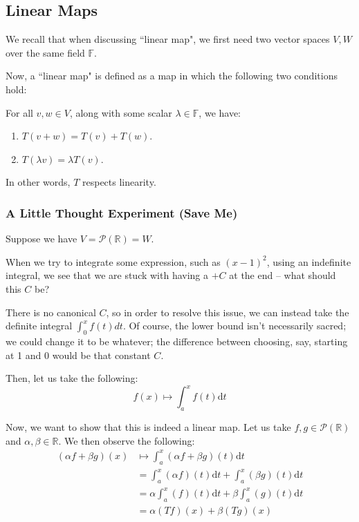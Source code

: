 \documentclass[openany]{book}
\newcommand{\RR}{\mathbb{R}}
\begin{document}
\subsection{Linear Maps}
We recall that when discussing ``linear map", we first need two vector spaces $V, W$ over the same field $\mathbb{F}$. 

Now, a ``linear map" is defined as a map in which the following two conditions hold:

For all $v, w \in V$, along with some scalar $\lambda \in \mathbb{F}$, we have:
\begin{enumerate}
	\item $T(v+w) = T(v) + T(w)$.
	\item $T(\lambda v) = \lambda T(v)$.
\end{enumerate}

In other words, $T$ respects linearity.

\subsubsection{A Little Thought Experiment (Save Me)}
Suppose we have $V = \mathscr{P}(\RR) = W$.

When we try to integrate some expression, such as $(x-1)^{2}$, using an indefinite integral, we see that we are stuck with having a $+C$ at the end -- what should this $C$ be?

There is no canonical $C$, so in order to resolve this issue, we can instead take the definite integral $\int_{0}^{x} f(t) dt$. Of course, the lower bound isn't necessarily sacred; we could change it to be whatever; the difference between choosing, say, starting at 1 and 0 would be that constant $C$.

Then, let us take the following:
\begin{equation*}
	f(x) \mapsto \int_{a}^{x} f(t) \mathrm d t
\end{equation*}

Now, we want to show that this is indeed a linear map. Let us take $f,g \in \mathscr{P}(\RR)$ and $\alpha, \beta \in \RR$. We then observe the following:
\begin{align*}
	(\alpha f + \beta g) (x) &\mapsto \int_{a}^{x} (\alpha f + \beta g)(t) \mathrm d t \\
	&= \int_{a}^{x} (\alpha f)(t) \mathrm d t + \int_{a}^{x} (\beta g)(t) \mathrm d t \\
	&= \alpha\int_{a}^{x} ( f)(t) \mathrm d t + \beta\int_{a}^{x} (g)(t) \mathrm d t \\
	&= \alpha (Tf)(x) + \beta (Tg)(x)
\end{align*}
\end{document}
